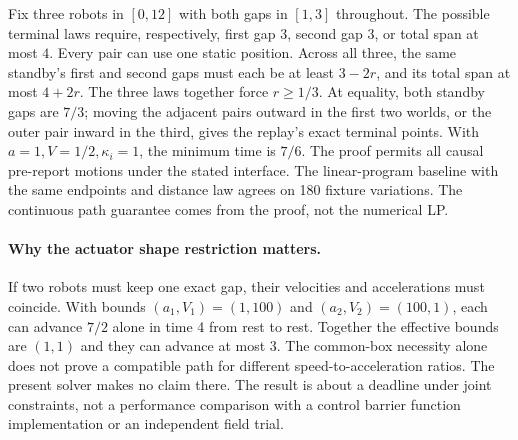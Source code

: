 \documentclass[11pt]{article}
\begin{document}
Fix three robots in \([0,12]\) with both gaps in \([1,3]\) throughout.
The possible terminal laws require, respectively, first gap \(3\),
second gap \(3\), or total span at most \(4\). Every pair can use
one static position. Across all three, the same standby's first
and second gaps must each be at least \(3-2r\), and its total span
at most \(4+2r\). The three laws together force \(r\ge1/3\).
At equality, both standby gaps are \(7/3\); moving the adjacent
pairs outward in the first two worlds, or the outer pair inward
in the third, gives the replay's exact terminal points. With
\(a=1,V=1/2,\kappa_i=1\), the minimum time is \(7/6\). The proof
permits all causal pre-report motions under the stated interface.
The linear-program baseline with the same endpoints and distance
law agrees on 180 fixture variations. The continuous path guarantee
comes from the proof, not the numerical LP.

\paragraph{Why the actuator shape restriction matters.}
If two robots must keep one exact gap, their velocities and
accelerations must coincide. With bounds \((a_1,V_1)=(1,100)\)
and \((a_2,V_2)=(100,1)\), each can advance \(7/2\) alone in time
4 from rest to rest. Together the effective bounds are \((1,1)\)
and they can advance at most 3. The common-box necessity alone
does not prove a compatible path for different speed-to-acceleration
ratios. The present solver makes no claim there. The
result is about a deadline under joint constraints, not a
performance comparison with a control barrier function
implementation or an independent field trial.
\end{document}
